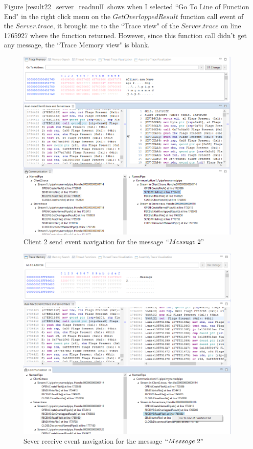Figure \ref{result22_server_readnull} shows when I selected ``Go To Line of Function End" in the right click menu on the $GetOverlappedResult$ function call event of the $Server.trace$, it brought me to the ``Trace view" of the $Server.trace$ on line 1765927 where the function returned. However, since this function call didn't get any message, the ``Trace Memory view" is blank.

\begin{figure}
\includegraphics[width=\textwidth]{Figures/result22_client_send}
 \caption{Client 2 send event navigation for the message $``Message\; 2"$}
\label{result22_client_send}
\end{figure}

\begin{figure}
\includegraphics[width=\textwidth]{Figures/result22_server_read}
 \caption{Sever receive event navigation for the message $``Message\; 2"$}
\label{result22_server_read}
\end{figure}

